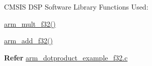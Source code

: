 \begin{DoxyParagraph}{C\-M\-S\-I\-S D\-S\-P Software Library Functions Used\-:}

\end{DoxyParagraph}
\begin{DoxyParagraph}{}

\begin{DoxyItemize}
\item \hyperlink{group___basic_mult_gaca3f0b8227da431ab29225b88888aa32}{arm\-\_\-mult\-\_\-f32()}
\item \hyperlink{group___basic_add_ga6a904a547413b10565dd1d251c6bafbd}{arm\-\_\-add\-\_\-f32()}
\end{DoxyItemize}
\end{DoxyParagraph}
{\bfseries  Refer } \hyperlink{arm_dotproduct_example_f32_8c-example}{arm\-\_\-dotproduct\-\_\-example\-\_\-f32.\-c} 